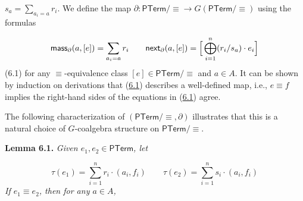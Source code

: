 \documentclass[11pt,a4paper]{amsart}
\begin{document}
\hypertarget{html:S6.SS0.SSS0.P0.SPx1.p1.m2}{}\({s_{a}=\sum_{a_{i}=a}r_{i}}\). We define the map %
\hypertarget{html:S6.SS0.SSS0.P0.SPx1.p1.m3}{}\({\partial\colon\mathsf{PTerm}/{\equiv}\to G(\mathsf{PTerm}/{\equiv})}\) using the formulas
\par\medskip
\hypertarget{html:S6.E1}{}   %
\hypertarget{html:S6.E1.m1}{}\[\mbox{\sf mass}_{\partial}(a,[e])=\sum_{a_{i}=a}r_{i}\qquad\mbox{\sf next}_{\partial}(a,[e])=\Big{[}\bigoplus_{i=1}^{n}(r_{i}/s_{a})\cdot e_{i}\Big{]}\]  (6.1)   for any %
\hypertarget{html:S6.SS0.SSS0.P0.SPx1.p1.m4}{}\({\equiv}\)-equivalence class %
\hypertarget{html:S6.SS0.SSS0.P0.SPx1.p1.m5}{}\({[e]\in\mathsf{PTerm}/{\equiv}}\) and %
\hypertarget{html:S6.SS0.SSS0.P0.SPx1.p1.m6}{}\({a\in A}\). It can be shown by induction on derivations that (\hyperlink{html:S6.E1}{6.1}) describes a well-defined map, i.e., %
\hypertarget{html:S6.SS0.SSS0.P0.SPx1.p1.m7}{}\({e\equiv f}\) implies the right-hand sides of the equations in (\hyperlink{html:S6.E1}{6.1}) agree.
\par\medskip
\hypertarget{html:S6.SS0.SSS0.P0.SPx1.p2}{} The following characterization of %
\hypertarget{html:S6.SS0.SSS0.P0.SPx1.p2.m1}{}\({(\mathsf{PTerm}/{\equiv},\partial)}\) illustrates that this is a natural choice of %
\hypertarget{html:S6.SS0.SSS0.P0.SPx1.p2.m2}{}\({G}\)-coalgebra structure on %
\hypertarget{html:S6.SS0.SSS0.P0.SPx1.p2.m3}{}\({\mathsf{PTerm}/{\equiv}}\).
\par\medskip
\hypertarget{html:S6.Thmtheorem1}{} \par\noindent\textbf{\textbf{Lemma 6.1}\textbf{.}}\quad  %
\hypertarget{html:S6.Thmtheorem1.p1}{} \emph{Given %
\hypertarget{html:S6.Thmtheorem1.p1.m1}{}\({e_{1},e_{2}\in\mathsf{PTerm}}\), let}
\par\medskip
\hypertarget{html:S6.Ex1}{}   %
\hypertarget{html:S6.Ex1.m1}{}\[\tau(e_{1})=\sum_{i=1}^{n}r_{i}\cdot(a_{i},f_{i})\qquad\tau(e_{2})=\sum_{i=1}^{n}s_{i}\cdot(a_{i},f_{i})\]    \emph{If %
\hypertarget{html:S6.Thmtheorem1.p1.m2}{}\({e_{1}\equiv e_{2}}\), then for any %
\hypertarget{html:S6.Thmtheorem1.p1.m3}{}\({a\in A}\),}
\end{document}
